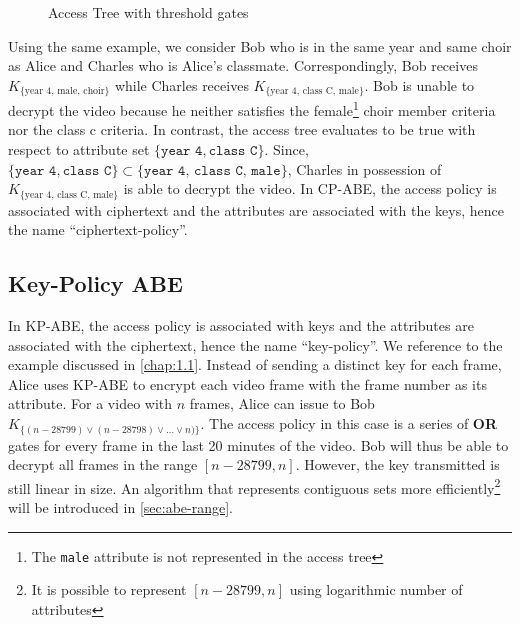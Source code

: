 \documentclass[hyp,a4paper,12pt,openbib]{socreport}
\begin{document}
\begin{figure}[h]
\centering
{}
\caption{Access Tree with threshold gates} \label{fig:access-tree-thresh}
\end{figure}

Using the same example, we consider Bob who is in the same year and same choir as Alice and Charles who is Alice's classmate. Correspondingly, Bob receives $K_{\{ \text{year 4, male, choir}\} }$ while Charles receives $K_{\{ \text{year 4, class C, male}\} }$. Bob is unable to decrypt the video because he neither satisfies the female\footnote{The \texttt{male} attribute is not represented in the access tree} choir member criteria nor the class c criteria. In contrast, the access tree evaluates to be true with respect to attribute set $\{ \texttt{year 4}, \texttt{class C}\}$. Since, $\{ \texttt{year 4}, \texttt{class C}\} \subset \{ \texttt{year 4, class C, male}\}$, Charles in possession of $K_{\{ \text{year 4, class C, male}\} }$ is able to decrypt the video. In CP-ABE, the access policy is associated with ciphertext and the attributes are associated with the keys, hence the name ``ciphertext-policy''.




\subsection{Key-Policy ABE}

In KP-ABE, the access policy is associated with keys and the attributes are associated with the ciphertext, hence the name ``key-policy''. We reference to the example discussed in \cref{chap:1.1}. Instead of sending a distinct key for each frame, Alice uses KP-ABE to encrypt each video frame with the frame number as its attribute. For a video with $n$ frames, Alice can issue to Bob $K_{\{ (n-28799) \vee (n-28798) \vee \dots \vee n) \}}$. The access policy in this case is a series of \textbf{OR} gates for every frame in the last 20 minutes of the video. Bob will thus be able to decrypt all frames in the range $[n-28799, n]$. However, the key transmitted is still linear in size. An algorithm that represents contiguous sets more efficiently\footnote{It is possible to represent $[n-28799, n]$ using logarithmic number of attributes} will be introduced in \cref{sec:abe-range}.
\end{document}
